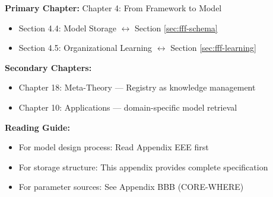 %
%

%
%
%
%

\begin{tcolorbox}[colback=purple!5!white, colframe=purple!75!black,
    title=Chapter Linkage]

\textbf{Primary Chapter:} Chapter 4: From Framework to Model
\begin{itemize}[nosep]
\item Section 4.4: Model Storage $\leftrightarrow$ Section \ref{sec:fff-schema}
\item Section 4.5: Organizational Learning $\leftrightarrow$ Section \ref{sec:fff-learning}
\end{itemize}

\textbf{Secondary Chapters:}
\begin{itemize}[nosep]
\item Chapter 18: Meta-Theory --- Registry as knowledge management
\item Chapter 10: Applications --- domain-specific model retrieval
\end{itemize}

\textbf{Reading Guide:}
\begin{itemize}[nosep]
\item For model design process: Read Appendix EEE first
\item For storage structure: This appendix provides complete specification
\item For parameter sources: See Appendix BBB (CORE-WHERE)
\end{itemize}

\end{tcolorbox}

